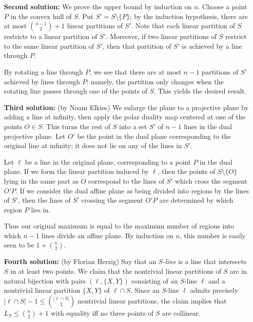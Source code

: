 \documentclass[amssymb,twocolumn,pra,10pt,aps]{revtex4-1}
\begin{document}
\begin{itemize}
\textbf{Second solution:}
We prove the upper bound
by induction on $n$. Choose a point $P$ in the convex hull of $S$.
Put $S' = S \setminus \{P\}$;
by the induction hypothesis, there are at most $\binom{n-1}{2} + 1$
linear partitions of $S'$. Note that each linear partition of $S$ restricts
to a linear partition of $S'$. Moreover, if two linear partitions of $S$
restrict to the same linear partition of $S'$, then that partition of $S'$
is achieved by a line through $P$.

By rotating a line through $P$, we see that there are at most $n-1$
partitions of $S'$ achieved by lines through $P$: namely, the partition only
changes when the rotating line passes through one of the points of $S$.
This yields the desired result.

\textbf{Third solution:} (by Noam Elkies) We enlarge the plane to a projective
plane by adding a line at infinity, then apply the polar duality map
centered at one of the points $O \in S$. This turns the rest of $S$ into
a set $S'$ of $n-1$ lines in the dual projective plane. Let $O'$ be the
point in the dual plane corresponding to the original line at infinity;
it does not lie on any of the lines in $S'$.

Let $\ell$ be a line in the original plane, corresponding to a point $P$ in
the dual plane. If we form the linear partition induced by $\ell$, then
the points of $S \setminus \{O\}$ lying in the same part as $O$
correspond to the lines of $S'$ which cross the segment $O'P$.
If we consider the dual affine plane as being divided into regions by
the lines of $S'$, then the lines of $S'$ crossing the segment $O'P$
are determined by which region $P$ lies in.

Thus our original maximum is equal to the maximum number of regions into
which $n-1$ lines divide an affine plane. By induction on $n$, this number
is easily seen to be $1 + \binom{n}{2}$.

\textbf{Fourth solution:} (by Florian Herzig)
Say that an \emph{$S$-line} is a line that intersects $S$ in at least two points.
We claim that the nontrivial linear partitions of $S$ are in natural bijection with pairs
$(\ell, \{X,Y\})$ consisting of an $S$-line $\ell$ and a nontrivial linear partition $\{X,Y\}$ of $\ell \cap S$.
Since an $S$-line $\ell$ admits precisely $|\ell\cap S|-1 \le \binom{|\ell \cap S|}{2}$ nontrivial linear partitions,
the claim implies that $L_S \le \binom n2 + 1$ with equality iff no three points of $S$ are collinear.


\end{itemize}
\end{document}
